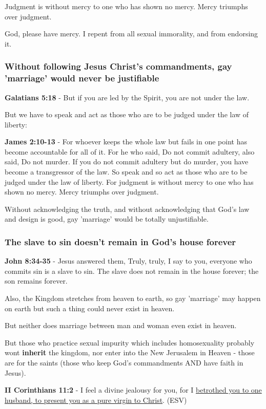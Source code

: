 \documentclass[11pt]{article}
\begin{document}
Judgment is without mercy to one who has shown no mercy. Mercy triumphs over judgment.

God, please have mercy. I repent from all sexual immorality, and from endorsing it.

\subsubsection{Without following Jesus Christ's commandments, gay 'marriage' would never be justifiable}
\label{sec:org358d95e}
\textbf{Galatians 5:18} - But if you are led by the Spirit, you are not under the law.

But we have to speak and act as those who are to be judged under the law of liberty:

\textbf{James 2:10-13} - For whoever keeps the whole law but fails in one point has become accountable for all of it. For he who said, Do not commit adultery, also said, Do not murder. If you do not commit adultery but do murder, you have become a transgressor of the law. So speak and so act as those who are to be judged under the law of liberty. For judgment is without mercy to one who has shown no mercy. Mercy triumphs over judgment.

Without acknowledging the truth, and without acknowledging that God's law and design is good, gay 'marriage' would be totally unjustifiable.

\subsubsection{The slave to sin doesn't remain in God's house forever}
\label{sec:org8705def}
\textbf{John 8:34-35} - Jesus answered them, Truly, truly, I say to you, everyone who commits sin is a slave to sin. The slave does not remain in the house forever; the son remains forever.

Also, the Kingdom stretches from heaven to earth, so gay 'marriage' may happen on earth but such a thing could never exist in heaven.

But neither does marriage between man and woman even exist in heaven.

But those who practice sexual impurity which includes homosexuality probably wont \textbf{inherit} the kingdom,
nor enter into the New Jerusalem in Heaven - those are for the saints (those who keep God's commandments AND have faith in Jesus).

\textbf{II Corinthians 11:2} - I feel a divine jealousy for you, for I \uline{betrothed you to one husband, to present you as a pure virgin to Christ}. (ESV)
\end{document}
